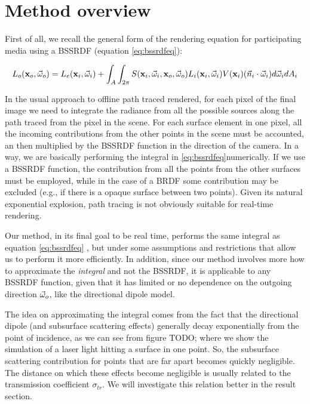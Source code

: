 \section{Method overview}

First of all, we recall the general form of the rendering equation for participating media using a BSSRDF (equation \ref{eq:bssrdfeq}):

\begin{equation*}
L_o(\mathbf{x}_o,\vec{\omega}_o) = L_e(\mathbf{x}_i,\vec{\omega}_i) + \int_A \int_{2\pi} S(\mathbf{x}_i, \vec{\omega}_i, \mathbf{x}_o, \vec{\omega}_o) L_i(\mathbf{x}_i,\vec{\omega}_i) V(\mathbf{x}_i) (\vec{n}_i \cdot \vec{\omega}_i) d\vec{\omega}_i d A_i
\end{equation*}

In the usual approach to offline path traced rendered, for each pixel of the final image we need to integrate the radiance from all the possible sources along the path traced from the pixel in the scene. For each surface element in one pixel, all the incoming contributions from the other points in the scene must be accounted, an then multiplied by the BSSRDF function in the direction of the camera. In a way, we are basically performing the integral in \ref{eq:bssrdfeq}numerically. If we use a BSSRDF function, the contribution from all the points from the other surfaces must be employed, while in the case of a BRDF some contribution may be excluded (e.g., if there is a opaque surface between two points). Given its natural exponential explosion, path tracing is not obviously suitable for real-time rendering.

Our method, in its final goal to be real time, performs the same integral as equation \ref{eq:bssrdfeq} , but under some assumptions and restrictions that allow us to perform it more efficiently. In addition, since our method involves more how to approximate the \emph{integral} and not the BSSRDF, it is applicable to any BSSRDF function, given that it has limited or no dependence on the outgoing direction $\vec{\omega}_o$, like the directional dipole model.

The idea on approximating the integral comes from the fact that the directional dipole (and subsurface scattering effects) generally decay exponentially from the point of incidence, as we can see from figure TODO; where we show the simulation of a laser light hitting a surface in one point. So, the subsurface scattering contribution for points that are far apart becomes quickly negligible. The distance on which these effects become negligible is usually related to the transmission coefficient $\sigma_{tr}$. We will investigate this relation better in the result section. 

